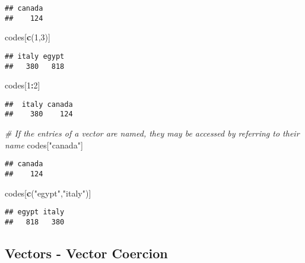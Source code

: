 \documentclass[
]{article}
\newenvironment{Shaded}{\begin{snugshade}}{\end{snugshade}}
\newcommand{\CommentTok}[1]{\textcolor[rgb]{0.56,0.35,0.01}{\textit{#1}}}
\newcommand{\DecValTok}[1]{\textcolor[rgb]{0.00,0.00,0.81}{#1}}
\newcommand{\KeywordTok}[1]{\textcolor[rgb]{0.13,0.29,0.53}{\textbf{#1}}}
\newcommand{\NormalTok}[1]{#1}
\newcommand{\OperatorTok}[1]{\textcolor[rgb]{0.81,0.36,0.00}{\textbf{#1}}}
\newcommand{\StringTok}[1]{\textcolor[rgb]{0.31,0.60,0.02}{#1}}
\begin{document}
\begin{verbatim}
## canada 
##    124
\end{verbatim}

\begin{Shaded}
\begin{Highlighting}[]
\NormalTok{codes[}\KeywordTok{c}\NormalTok{(}\DecValTok{1}\NormalTok{,}\DecValTok{3}\NormalTok{)]}
\end{Highlighting}
\end{Shaded}

\begin{verbatim}
## italy egypt 
##   380   818
\end{verbatim}

\begin{Shaded}
\begin{Highlighting}[]
\NormalTok{codes[}\DecValTok{1}\OperatorTok{:}\DecValTok{2}\NormalTok{]}
\end{Highlighting}
\end{Shaded}

\begin{verbatim}
##  italy canada 
##    380    124
\end{verbatim}

\begin{Shaded}
\begin{Highlighting}[]
\CommentTok{# If the entries of a vector are named, they may be accessed by referring to their name}
\NormalTok{codes[}\StringTok{"canada"}\NormalTok{]}
\end{Highlighting}
\end{Shaded}

\begin{verbatim}
## canada 
##    124
\end{verbatim}

\begin{Shaded}
\begin{Highlighting}[]
\NormalTok{codes[}\KeywordTok{c}\NormalTok{(}\StringTok{"egypt"}\NormalTok{,}\StringTok{"italy"}\NormalTok{)]}
\end{Highlighting}
\end{Shaded}

\begin{verbatim}
## egypt italy 
##   818   380
\end{verbatim}

\hypertarget{vectors---vector-coercion}{%
\subsection{Vectors - Vector Coercion}\label{vectors---vector-coercion}}
\end{document}
